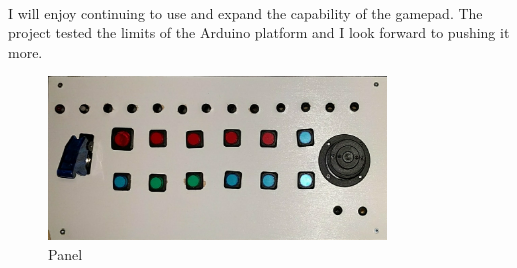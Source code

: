 \documentclass[12pt,a4paper]{article}
\begin{document}
\paragraph{}
I will enjoy continuing to use and expand the capability of the gamepad. The project tested the limits of the Arduino platform and I look forward to pushing it more.

\begin{figure}[h]
	\centering
	\includegraphics[width=0.8\textwidth]{panel}
	\caption{Panel}
	\label{fig:panel}
\end{figure}
\end{document}
